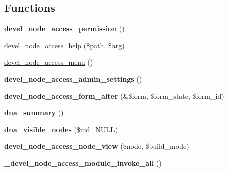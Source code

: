 \subsection*{Functions}
\begin{DoxyCompactItemize}
\item 
\hypertarget{devel__node__access_8module_a89638514e30dec27e609710d8460029c}{
{\bfseries devel\_\-node\_\-access\_\-permission} ()}
\label{devel__node__access_8module_a89638514e30dec27e609710d8460029c}

\item 
\hyperlink{devel__node__access_8module_afbc807b6e8d3f6a358d446096b66d7c6}{devel\_\-node\_\-access\_\-help} (\$path, \$arg)
\item 
\hyperlink{devel__node__access_8module_ac40f3cbfd11533898c8c6b9b5dd4eae5}{devel\_\-node\_\-access\_\-menu} ()
\item 
\hypertarget{devel__node__access_8module_ae76917085bd84812671d3573fa272ef4}{
{\bfseries devel\_\-node\_\-access\_\-admin\_\-settings} ()}
\label{devel__node__access_8module_ae76917085bd84812671d3573fa272ef4}

\item 
\hypertarget{devel__node__access_8module_a65d454861145f6881dc6769594d34315}{
{\bfseries devel\_\-node\_\-access\_\-form\_\-alter} (\&\$form, \$form\_\-state, \$form\_\-id)}
\label{devel__node__access_8module_a65d454861145f6881dc6769594d34315}

\item 
\hypertarget{devel__node__access_8module_a2c256da8a2a5dcebb475ed06b2c8b77d}{
{\bfseries dna\_\-summary} ()}
\label{devel__node__access_8module_a2c256da8a2a5dcebb475ed06b2c8b77d}

\item 
\hypertarget{devel__node__access_8module_af5ee7969cd44f01dc45568fef5202899}{
{\bfseries dna\_\-visible\_\-nodes} (\$nid=NULL)}
\label{devel__node__access_8module_af5ee7969cd44f01dc45568fef5202899}

\item 
\hypertarget{devel__node__access_8module_a9b0aafdaf5b0f5d52747d177c18236ec}{
{\bfseries devel\_\-node\_\-access\_\-node\_\-view} (\$node, \$build\_\-mode)}
\label{devel__node__access_8module_a9b0aafdaf5b0f5d52747d177c18236ec}

\item 
\hypertarget{devel__node__access_8module_af4adcf1c9368b3834527176efd47d9b6}{
{\bfseries \_\-devel\_\-node\_\-access\_\-module\_\-invoke\_\-all} ()}
\label{devel__node__access_8module_af4adcf1c9368b3834527176efd47d9b6}


\end{DoxyCompactItemize}
